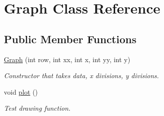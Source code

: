 \hypertarget{classGraph}{
\section{Graph Class Reference}
\label{classGraph}
}
\subsection*{Public Member Functions}
\begin{DoxyCompactItemize}
\item 
\hypertarget{classGraph_a97a602093d0c5ccfd3386aba5b9b6ccb}{
\hyperlink{classGraph_a97a602093d0c5ccfd3386aba5b9b6ccb}{Graph} (int row, int xx, int x, int yy, int y)}
\label{classGraph_a97a602093d0c5ccfd3386aba5b9b6ccb}

\begin{DoxyCompactList}\small\item\em Constructor that takes data, x divisions, y divisions. \item\end{DoxyCompactList}\item 
\hypertarget{classGraph_a397e6e5732512984591030d633971ba5}{
void \hyperlink{classGraph_a397e6e5732512984591030d633971ba5}{plot} ()}
\label{classGraph_a397e6e5732512984591030d633971ba5}

\begin{DoxyCompactList}\small\item\em Test drawing function. \item\end{DoxyCompactList}\end{DoxyCompactItemize}
